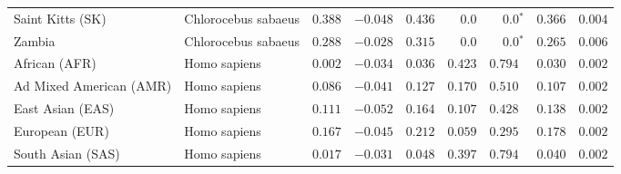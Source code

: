 \begin{center}
\begin{adjustbox}{width = 1\textwidth}
\begin{tabular}{|l|l|r|r|r|r|r|r|r|}
            Saint Kitts (SK)                  & Chlorocebus sabaeus        & $ 0.388$ & $-0.048$   & $ 0.436$ & $0.0$ & $\bm{0.0{^*}}$     & $ 0.366$ & $ 0.004$ \\
            Zambia        & Chlorocebus sabaeus        & $ 0.288$ & $-0.028$   & $ 0.315$ & $0.0$ & $\bm{0.0{^*}}$ & $ 0.265$ & $ 0.006$ \\
            African (AFR)               & Homo sapiens        & $ 0.002$ & $-0.034$   & $ 0.036$ & $ 0.423$ & $ 0.794~~$     & $ 0.030$ & $ 0.002$ \\
            Ad Mixed American (AMR)                 & Homo sapiens        & $ 0.086$ & $-0.041$   & $ 0.127$ & $ 0.170$ & $ 0.510~~$     & $ 0.107$ & $ 0.002$ \\
            East Asian (EAS)              & Homo sapiens        & $ 0.111$ & $-0.052$   & $ 0.164$ & $ 0.107$ & $ 0.428~~$     & $ 0.138$ & $ 0.002$ \\
            European (EUR)              & Homo sapiens        & $ 0.167$ & $-0.045$   & $ 0.212$ & $ 0.059$ & $ 0.295~~$     & $ 0.178$ & $ 0.002$ \\
            South Asian (SAS)              & Homo sapiens        & $ 0.017$ & $-0.031$   & $ 0.048$ & $ 0.397$ & $ 0.794~~$     & $ 0.040$ & $ 0.002$ \\
            \bottomrule
        \end{tabular}
    \end{adjustbox}
\end{center}
